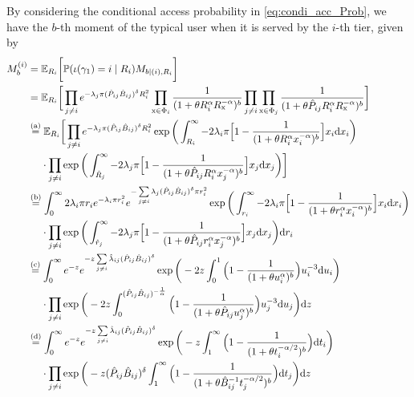 \documentclass[12pt,draftclsnofoot,journal,onecolumn]{IEEEtran}
\def\E{\mathbb{E}}
\def\P{\mathbb{P}}
\def\dd{\mathrm{d}}
\def\eqa{\stackrel{{\rm (a)}}{=}}
\def\eqb{\stackrel{{\rm (b)}}{=}}
\def\eqc{\stackrel{{\rm (c)}}{=}}
\def\eqd{\stackrel{{\rm (d)}}{=}}
\begin{document}
\begin{IEEEproof}
	By considering the conditional access probability in \eqref{eq:condi_acc_Prob}, we have the $b$-th moment of the typical user when it is served by the $i$-th tier, given by
    \allowdisplaybreaks
	\begin{align}\label{eq:Mb_typ_ith}
	M_b^{(i)} &= \E_{R_i}\bigg[\P(\iota(\gamma_1)=i \mid R_i) M_{b\mid (i),R_i}\bigg] \nonumber \\
	&= \E_{R_i}\bigg[\prod\limits_{j\neq i}e^{-\lambda_j\pi (\hat P_{ij} \hat B_{ij})^{\delta} R_i^2}  \prod_{{\rm x} \in \Phi_i} \frac{1}{(1+\theta R_i^{\alpha}R_{{\rm x}}^{-\alpha})^b} \prod_{j\neq i}\prod_{{\rm x} \in\Phi_j}\frac{1}{(1+\theta {\hat P_{ij}} R_i^{\alpha} R_{{\rm x}}^{-\alpha})^b } \bigg] \nonumber \\
	&\eqa \E_{R_i}\bigg[\prod\limits_{j\neq i}e^{-\lambda_j\pi (\hat P_{ij} \hat B_{ij})^{\delta} R_i^2} \exp\bigg(\int_{R_i}^\infty -2\lambda_i\pi\Big[1- \frac{1}{(1+\theta R_i^\alpha x_i^{-\alpha})^b} \Big]x_i\dd x_i \bigg) \nonumber\\
	&~~~~\cdot \prod\limits_{j\neq i} \exp\bigg(\int_{\hat R_j}^\infty -2\lambda_j\pi\Big[1- \frac{1}{(1+\theta \hat P_{ij} R_i^\alpha x_j^{-\alpha})^b} \Big]x_j\dd x_j \bigg)  \bigg] \nonumber \\
	&\eqb \int_0^\infty 2\lambda_i \pi r_i e^{-\lambda_i \pi r_i^2} e^{-\sum\limits_{j\neq i}\lambda_j (\hat P_{ij} \hat B_{ij})^{\delta}\pi r_i^2}  \exp\bigg(\int_{r_i}^\infty -2\lambda_i\pi\Big[1- \frac{1}{(1+\theta r_i^\alpha x_i^{-\alpha})^b} \Big]x_i\dd x_i \bigg) \nonumber\\
	&~~~~\cdot \prod\limits_{j\neq i} \exp\bigg(\int_{\hat r_j}^\infty -2\lambda_j\pi\Big[1- \frac{1}{(1+\theta \hat P_{ij} r_i^\alpha x_j^{-\alpha})^b} \Big]x_j\dd x_j \bigg) \dd r_i \nonumber \\
	&\eqc \int_0^\infty e^{-z} e^{-z\sum\limits_{j\neq i}\hat\lambda_{ij} (\hat P_{ij} \hat B_{ij})^{\delta}} \exp\bigg(-2z \int_0^1\Big(1-\frac{1}{(1+\theta u_i^\alpha)^b} \Big)u_i^{-3}\dd u_i \bigg) \nonumber \\
	&~~~~\cdot \prod\limits_{j\neq i} \exp\bigg(-2z \int_0^{(\hat P_{ij} \hat B_{ij})^{-\frac{1}{\alpha}}}\Big(1-\frac{1}{(1+\theta \hat P_{ij} u_j^\alpha)^b} \Big)u_j^{-3}\dd u_j \bigg) \dd z \nonumber \\
	&\eqd \int_0^\infty e^{-z} e^{-z\sum\limits_{j\neq i}\hat\lambda_{ij} (\hat P_{ij} \hat B_{ij})^{\delta}} \exp\bigg(-z \int_1^\infty \Big(1-\frac{1}{(1+\theta t_i^{-\alpha/2})^b} \Big)\dd t_i \bigg) \nonumber \\
	&~~~~\cdot \prod\limits_{j\neq i} \exp\bigg(-z(\hat P_{ij} \hat B_{ij})^{\delta} \int_1^\infty\Big(1-\frac{1}{(1+\theta \hat B_{ij}^{-1} t_j^{-\alpha/2})^b} \Big)\dd t_j \bigg) \dd z 

\end{align}
\end{IEEEproof}
\end{document}

